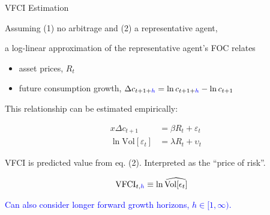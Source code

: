 \begin{frame}{VFCI Estimation}

  \vspace{0.3cm}
  Assuming (1) no arbitrage and (2) a representative agent,
  
  a log-linear approximation of the representative agent's FOC relates
  \begin{itemize}
    \item asset prices, $R_t$
    \item future consumption growth, $\Delta c_{t+1+\textcolor{blue}{h}} = \ln c_{t+ 1 + \textcolor{blue}{h}} - \ln c_{t+1}$
  \end{itemize}

  This relationship can be estimated empirically:

  \vspace{-1cm}
  \begin{align}x
    \Delta c_{t+1} &= \beta R_t + \varepsilon_t
    \\
    \ln \text{Vol}[\varepsilon_t] &= \lambda R_t + \upsilon_t
  \end{align}

  VFCI is predicted value from eq. (2). Interpreted as the ``price of risk''.

  \vspace{-1cm}
  \setcounter{equation}{0}
  \begin{align*}
    \text{VFCI}_{t,\textcolor{blue}{h}} &\equiv \ln \widehat{\text{Vol}[\epsilon_t]}
  \end{align*}

  \textcolor{blue}{Can also consider longer forward growth horizons, $h \in [1,\infty)$.}

\end{frame}



